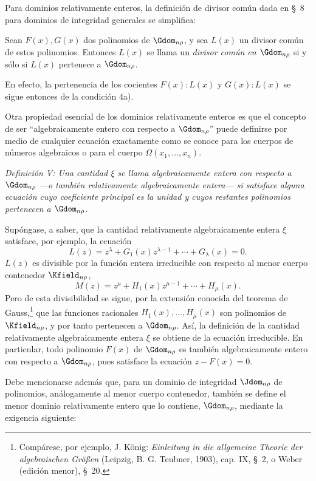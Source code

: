 \documentclass[11pt]{article}
\begin{document}
Para dominios relativamente enteros, la definición de divisor común dada en \S\ 8 para dominios de integridad generales se simplifica:

Sean $F(x),G(x)$ dos polinomios de $\Gdom_{n\rho}$, y sea $L(x)$ un divisor común de estos polinomios. Entonces $L(x)$ se llama un \emph{divisor común en $\Gdom_{n\rho}$} si y sólo si $L(x)$ pertenece a $\Gdom_{n\rho}$.

En efecto, la pertenencia de los cocientes $F(x):L(x)$ y $G(x):L(x)$ se sigue entonces de la condición 4a).

Otra propiedad esencial de los dominios relativamente enteros es que el concepto de ser ``algebraicamente entero con respecto a $\Gdom_{n\rho}$'' puede definirse por medio de cualquier ecuación exactamente como se conoce para los cuerpos de números algebraicos o para el cuerpo $\Omega(x_1,\ldots,x_n)$.

\emph{Definición V: Una cantidad $\xi$ se llama algebraicamente entera con respecto a $\Gdom_{n\rho}$ ---o también relativamente algebraicamente entera--- si satisface alguna ecuación cuyo coeficiente principal es la unidad y cuyos restantes polinomios pertenecen a $\Gdom_{n\rho}$.}

Supóngase, a saber, que la cantidad relativamente algebraicamente entera $\xi$ satisface, por ejemplo, la ecuación
\[
  L(z)=z^\lambda+G_1(x)z^{\lambda-1}+\cdots+G_\lambda(x)=0.
\]
$L(z)$ es divisible por la función entera irreducible con respecto al menor cuerpo contenedor $\Kfield_{n\rho}$,
\[
  M(z)=z^\mu+H_1(x)z^{\mu-1}+\cdots+H_\mu(x).
\]
Pero de esta divisibilidad se sigue, por la extensión conocida del teorema de Gauss,\footnote{Compárese, por ejemplo, J. König: \emph{Einleitung in die allgemeine Theorie der algebraischen Größen} (Leipzig, B. G. Teubner, 1903), cap. IX, \S\ 2, o Weber (edición menor), \S\ 20.} que las funciones racionales $H_1(x),\ldots,H_\mu(x)$ son polinomios de $\Kfield_{n\rho}$, y por tanto pertenecen a $\Gdom_{n\rho}$. Así, la definición de la cantidad relativamente algebraicamente entera $\xi$ se obtiene de la ecuación irreducible. En particular, todo polinomio $F(x)$ de $\Gdom_{n\rho}$ es también algebraicamente entero con respecto a $\Gdom_{n\rho}$, pues satisface la ecuación $z-F(x)=0$.

Debe mencionarse además que, para un dominio de integridad $\Jdom_{n\rho}$ de polinomios, análogamente al menor cuerpo contenedor, también se define el menor dominio relativamente entero que lo contiene, $\Gdom_{n\rho}$, mediante la exigencia siguiente:
\end{document}
